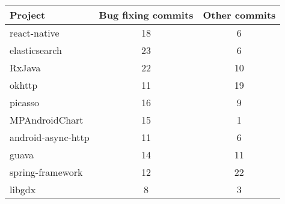 \begin{table}
\centering
\label{CommitValidationTable}
\begin{tabular}{ |l|c|c| }
\hline
Project & Bug fixing commits    & Other commits \\
\hline
react-native    & 18    & 6 \\
\hline
elasticsearch   & 23    & 6 \\
\hline
RxJava  & 22    & 10    \\
\hline
okhttp  & 11    & 19    \\
\hline
picasso & 16    & 9 \\
\hline
MPAndroidChart  & 15    & 1 \\
\hline
android-async-http  & 11    & 6 \\
\hline
guava   & 14    & 11    \\
\hline
spring-framework    & 12    & 22    \\
\hline
libgdx  & 8 & 3 \\
\hline
\end{tabular}
\caption{}

\end{table}
